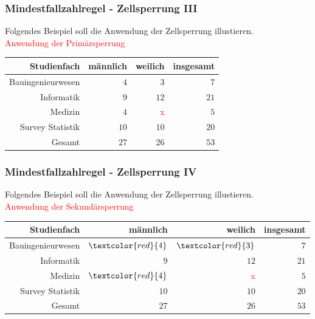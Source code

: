\documentclass[aspectratio=169]{beamer}
\begin{document}
\begin{frame}
    \frametitle{Mindestfallzahlregel - Zellsperrung III}
    Folgendes Beispiel soll die Anwendung der Zellsperrung illustieren. \\
    \textcolor{red}{Anwendung der Primärsperrung}
    \begin{center}
        \begin{tabular}{ r r r r }
         \textbf{Studienfach} \vline & \textbf{männlich} & \textbf{weilich} & \textbf{insgesamt} \\ 
         \hline
         Bauingenieurwesen \vline & $4$ & $3$ & $7$ \\
         Informatik \vline & $9$ & $12$ & $21$ \\  
         Medizin \vline & $4$ & \textcolor{red}{x} & $5$ \\
         Survey Statistik \vline & $10$ & $10$ & $20$ \\
         \hline
         Gesamt \vline & $27$ & $26$ & $53$
        \end{tabular}
    \end{center}
\end{frame}


\begin{frame}
    \frametitle{Mindestfallzahlregel - Zellsperrung IV}
    Folgendes Beispiel soll die Anwendung der Zellsperrung illustieren. \\
    \textcolor{red}{Anwendung der Sekundärsperrung}
    \begin{center}
        \begin{tabular}{ r r r r }
         \textbf{Studienfach} \vline & \textbf{männlich} & \textbf{weilich} & \textbf{insgesamt} \\ 
         \hline
         Bauingenieurwesen \vline & $\textcolor{red}{4}$ & $\textcolor{red}{3}$ & $7$ \\
         Informatik \vline & $9$ & $12$ & $21$ \\  
         Medizin \vline & $\textcolor{red}{4}$ & \textcolor{red}{x} & $5$ \\
         Survey Statistik \vline & $10$ & $10$ & $20$ \\
         \hline
         Gesamt \vline & $27$ & $26$ & $53$
        \end{tabular}
    \end{center}
\end{frame}
\end{document}
